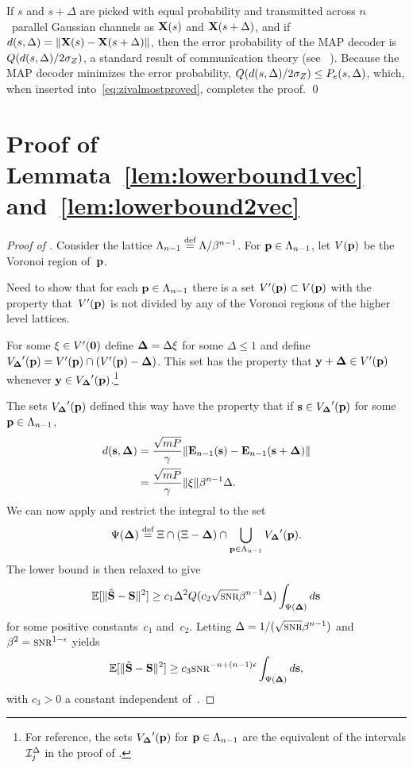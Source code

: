 \begin{subappendices}
  If $s$ and $s+\Delta$ are picked with equal probability and transmitted across
  $n$~parallel Gaussian channels as $\mathbf{X}(s)$ and $\mathbf{X}(s+\Delta)$, and if $d(s,
  \Delta) = \| \mathbf{X}(s) - \mathbf{X}(s + \Delta)\|$, then the error probability of the MAP
  decoder is $Q(d(s,\Delta) / 2 {\sigma_Z})$, a standard result of communication theory
  (see \eg~\cite[Section~4.5]{WozencraftJ1965}). Because the MAP decoder minimizes
  the error probability, $Q(d(s,\Delta)/2{\sigma_Z}) \le P_e(s,\Delta)$, which, when
  inserted into~\eqref{eq:zivalmostproved}, completes the proof. \hfill\qed


  \section{Proof of Lemmata~\ref{lem:lowerbound1vec}
  and~\ref{lem:lowerbound2vec}}

  \begin{proof}[Proof of ]
    Consider the lattice ${\Lambda_{n-1}} \stackrel{\text{def}}{=} \Lambda/\beta^{n-1}$. For $\mathbf{p} \in
    {\Lambda_{n-1}}$, let $V(\mathbf{p})$ be the Voronoi region of~$\mathbf{p}$.

    \begin{notebox}
      Need to show that for each $\mathbf{p} \in {\Lambda_{n-1}}$ there is a set $V'(\mathbf{p}) \subset
      V(\mathbf{p})$ with the property that~$V'(\mathbf{p})$ is not divided by any of the
      Voronoi regions of the higher level lattices.
    \end{notebox}

    For some $\mathbf{\xi} \in V'(\mathbf{0})$ define $\mathbf{\Delta} = \Delta \mathbf{\xi}$ for some $\Delta \le
    1$ and define ${V_{\mathbf{\Delta}}}'(\mathbf{p}) = V'(\mathbf{p}) \cap (V'(\mathbf{p}) - \mathbf{\Delta})$. This set has the
    property that $\mathbf{y} + \mathbf{\Delta} \in V'(\mathbf{p})$ whenever $\mathbf{y} \in {V_{\mathbf{\Delta}}}'(\mathbf{p})$.\footnote{For
    reference, the sets ${V_{\mathbf{\Delta}}}'(\mathbf{p})$ for $\mathbf{p} \in {\Lambda_{n-1}}$ are the equivalent of the
    intervals $\mathcal{I}_j^{\Delta}$ in the proof of .}

    The sets ${V_{\mathbf{\Delta}}}'(\mathbf{p})$ defined this way have the property that if $\mathbf{s} \in
    {V_{\mathbf{\Delta}}}'(\mathbf{p})$ for some $\mathbf{p} \in {\Lambda_{n-1}}$,
    \begin{align*}
      d(\mathbf{s},\mathbf{\Delta}) &= \frac{\sqrt{mP}}{\gamma} \| \mathbf{E}_{n-1}(\mathbf{s}) - \mathbf{E}_{n-1}(\mathbf{s} +
      \mathbf{\Delta}) \| \\
      &= \frac{\sqrt{mP}}{\gamma} \| \mathbf{\xi} \| \beta^{n-1} \Delta.
    \end{align*}
    We can now apply  and restrict the integral to the set
    \[ \Psi(\mathbf{\Delta}) \stackrel{\text{def}}{=} \Xi \cap (\Xi - \mathbf{\Delta}) \cap \bigcup_{\mathbf{p} \in {\Lambda_{n-1}}} {V_{\mathbf{\Delta}}}'(\mathbf{p}).
    \]
    The lower bound is then relaxed to give
    \begin{equation*}
      \msev \ge c_1 \Delta^2 Q(c_2 \sqrt{\snr} \beta^{n-1} \Delta) 
      \int_{\Psi(\Dv)} d\s
    \end{equation*}
    for some positive constants~$c_1$ and~$c_2$. Letting $\Delta =
    1/(\sqrt{\snr} \beta^{n-1})$ and $\beta^2 = \snr^{1-\e}$ yields
    \begin{equation*}
      \msev \ge c_3 \snr^{-n+(n-1)\e} \int_{\Psi(\Dv)} d\s,
    \end{equation*}
    with $c_3 > 0$ a constant independent of~\snr.


\end{proof}
\end{subappendices}
